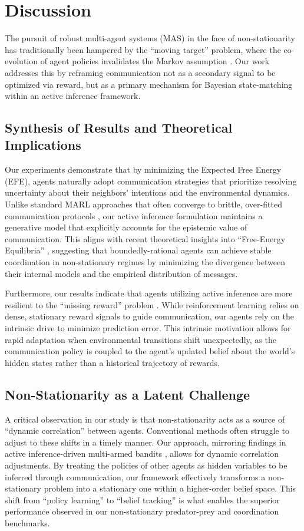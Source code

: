 \section{Discussion}

The pursuit of robust multi-agent systems (MAS) in the face of non-stationarity has traditionally been hampered by the ``moving target'' problem, where the co-evolution of agent policies invalidates the Markov assumption \cite{Foerster2017}. Our work addresses this by reframing communication not as a secondary signal to be optimized via reward, but as a primary mechanism for Bayesian state-matching within an active inference framework.

\subsection{Synthesis of Results and Theoretical Implications}
Our experiments demonstrate that by minimizing the Expected Free Energy (EFE), agents naturally adopt communication strategies that prioritize resolving uncertainty about their neighbors' intentions and the environmental dynamics. Unlike standard MARL approaches that often converge to brittle, over-fitted communication protocols \cite{Sukhbaatar2016}, our active inference formulation maintains a generative model that explicitly accounts for the epistemic value of communication. This aligns with recent theoretical insights into ``Free-Energy Equilibria'' \cite{ref_new_FreeEnergyEquil}, suggesting that boundedly-rational agents can achieve stable coordination in non-stationary regimes by minimizing the divergence between their internal models and the empirical distribution of messages.

Furthermore, our results indicate that agents utilizing active inference are more resilient to the ``missing reward'' problem \cite{ref_new_TheMissingRewar}. While reinforcement learning relies on dense, stationary reward signals to guide communication, our agents rely on the intrinsic drive to minimize prediction error. This intrinsic motivation allows for rapid adaptation when environmental transitions shift unexpectedly, as the communication policy is coupled to the agent's updated belief about the world's hidden states rather than a historical trajectory of rewards.

\subsection{Non-Stationarity as a Latent Challenge}
A critical observation in our study is that non-stationarity acts as a source of ``dynamic correlation'' between agents. Conventional methods often struggle to adjust to these shifts in a timely manner. Our approach, mirroring findings in active inference-driven multi-armed bandits \cite{ref_new_ActiveInference}, allows for dynamic correlation adjustments. By treating the policies of other agents as hidden variables to be inferred through communication, our framework effectively transforms a non-stationary problem into a stationary one within a higher-order belief space. This shift from ``policy learning'' to ``belief tracking'' is what enables the superior performance observed in our non-stationary predator-prey and coordination benchmarks.

